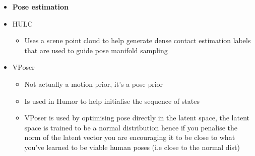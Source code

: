 \begin{itemize}
    \item \textbf{Pose estimation}
    \item HULC
    \begin{itemize}
        \item Uses a scene point cloud to help generate dense contact estimation labels that are used to guide pose manifold sampling 
    \end{itemize}
    \item VPoser
    \begin{itemize}
        \item Not actually a motion prior, it's a pose prior
        \item Is used in Humor to help initialise the sequence of states
        \item VPoser is used by optimising pose directly in the latent space, the latent space is trained to be a normal distribution hence if you penalise the norm of the latent vector you are encouraging it to be close to what you've learned to be viable human poses (i.e close to the normal dist)
    \end{itemize}


\end{itemize}
